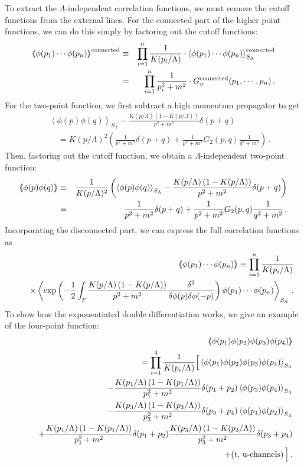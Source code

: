 \documentclass[aps,prd,preprint,groupedaddress,preprintnumbers,longbibliography]{revtex4-1}
\newcommand{\nn}{\nonumber}
\newcommand{\SL}{S_\Lambda}
\newcommand{\vev}[1]{\left\langle #1 \right\rangle}
\newcommand{\vvev}[1]{\vev{\kern-0.3em\left\langle #1
    \right\rangle\kern-0.3em}}
\begin{document}
To extract the $\Lambda$-independent correlation functions, we must
remove the cutoff functions from the external lines.  For the
connected part of the higher point functions, we can do this simply by
factoring out the cutoff functions:
\begin{eqnarray}
\vvev{\phi (p_1) \cdots \phi (p_n)}^{\mathrm{connected}}
&\equiv& \prod_{i=1}^n \frac{1}{K(p_i/\Lambda)} \cdot \vev{\phi (p_1) \cdots
  \phi (p_n)}_{S_\Lambda}^{\mathrm{connected}} \\
&=& \prod_{i=1}^n \frac{1}{p_i^2+m^2} \cdot G_n^{\mathrm{connected}}
(p_1, \cdots, p_n)\nn\,.
\end{eqnarray}
For the two-point function, we first subtract a high momentum
propagator to get
\begin{eqnarray}
&&\vev{\phi (p) \phi (q)}_{S_\Lambda} - \frac{K(p/\Lambda)\left(1 -
    K(p/\Lambda)\right)}{p^2+m^2} \delta (p+q)\nn\\
&&\quad = K(p/\Lambda)^2 \left( \frac{1}{p^2+m^2}  \delta (p+q) +
  \frac{1}{p^2+m^2} G_2 (p,q) \frac{1}{q^2+m^2}\right)\,.
\end{eqnarray}
Then, factoring out the cutoff function, we obtain a
$\Lambda$-independent two-point function:
\begin{eqnarray}
\vvev{\phi (p) \phi (q)} &\equiv& \frac{1}{K(p/\Lambda)^2}
\left( \vev{\phi (p) \phi (q)}_{S_\Lambda} - \frac{K(p/\Lambda)\left(1 -
    K(p/\Lambda)\right)}{p^2 + m^2} \delta (p+q) \right)\\
&=&  \frac{1}{p^2+m^2} \delta (p+q) + \frac{1}{p^2+m^2} G_2 (p,q)
  \frac{1}{q^2+m^2} \,.\nn
\end{eqnarray}
Incorporating the disconnected part, we can express the full
correlation functions as
\begin{eqnarray}
&&\vvev{\phi (p_1) \cdots \phi (p_n)}
\equiv \prod_{i=1}^n \frac{1}{K(p_i/\Lambda)}\nn\\
&&\quad \times 
\vev{\exp \left( - \frac{1}{2} \int_p \frac{K(p/\Lambda)\left(1 -
        K(p/\Lambda)\right)}{p^2+m^2} \frac{\delta^2}{\delta \phi (p)
      \delta \phi (-p)} \right) \phi (p_1) \cdots \phi
  (p_n)}_{S_\Lambda}\,.\label{Lambda-ind}
\end{eqnarray}
To show how the exponentiated double differentiation works, we give an
example of the four-point function:
\begin{eqnarray}
  &&\vvev{\phi (p_1) \phi (p_2) \phi (p_3) \phi (p_4)}\nn\\
  &&= \prod_{i=1}^4 \frac{1}{K(p_i/\Lambda)} \Big[
  \vev{\phi (p_1) \phi (p_2) \phi (p_3) \phi (p_4)}_{\SL}\nn\\
  &&\qquad -
  \frac{K(p_1/\Lambda)\left(1-K(p_1/\Lambda)\right)}{p_1^2+m^2} \delta
  (p_1+p_2) \vev{\phi (p_3) \phi (p_4)}_{\SL}\nn\\
  &&\qquad - \frac{K(p_3/\Lambda)\left(1-K(p_3/\Lambda)\right)}{p_3^2+m^2} \delta
  (p_3+p_4) \vev{\phi (p_1) \phi (p_2)}_{\SL}\nn\\
  &&\qquad +
  \frac{K(p_1/\Lambda)\left(1-K(p_1/\Lambda)\right)}{p_1^2+m^2}
  \delta (p_1+p_2)
  \frac{K(p_3/\Lambda)\left(1-K(p_3/\Lambda)\right)}{p_3^2+m^2} \delta 
  (p_3+p_4)\nn\\
  &&\quad + (\textrm{t, u-channels}) \, \Big]\,.
\end{eqnarray}
\end{document}
